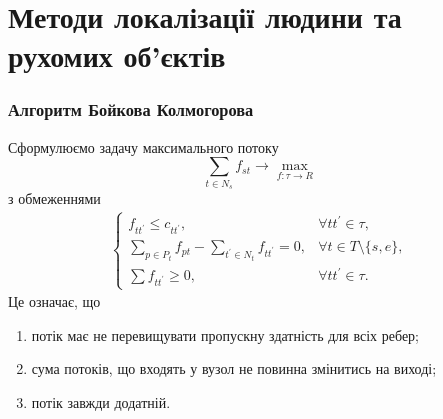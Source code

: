 \section{Методи локалізації людини та рухомих об'єктів}
\begin{frame}
	\frametitle{Алгоритм Бойкова Колмогорова}

	Сформулюємо задачу максимального потоку
	\begin{equation*}
		\sum_{t \in N_s}f_{st}\rightarrow \max_{f: \tau \rightarrow R }
	\end{equation*}
	з обмеженнями
	\begin{equation*}
		\begin{gathered}
			\begin{cases}
				f_{tt^{'}}\leq c_{tt^{'}},                                 & \forall tt^{'}\in \tau ,           \\
				\sum_{p \in P_t}f_{pt}- \sum_{t^{'} \in N_t}f_{tt^{'}}= 0, & \forall t \in T \setminus \{s,e\}, \\
				\sum f_{tt^{'}}\geq 0,                                     & \forall tt^{'}\in \tau.
			\end{cases}
		\end{gathered}
	\end{equation*}
	Це означає, що
	\begin{enumerate}
		\item потік має не перевищувати пропускну здатність для всіх ребер;

		\item сума потоків, що входять у вузол не повинна змінитись на виході;

		\item потік завжди додатній.
	\end{enumerate}
\end{frame}